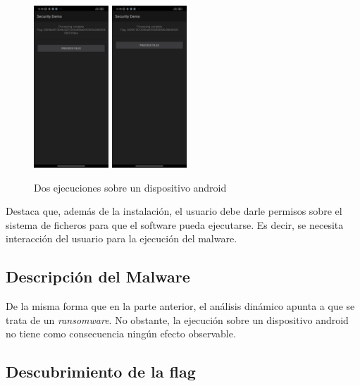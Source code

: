 \documentclass[]{article}
\begin{document}
\begin{figure}[H]
\centering
\includegraphics[width=0.25\textwidth]{screenshot1.jpg}
\includegraphics[width=0.25\textwidth]{screenshot2.jpg}
\caption{Dos ejecuciones sobre un dispositivo android}
\label{ejec}
\end{figure}

Destaca que, además de la instalación, el usuario debe darle permisos sobre el
sistema de ficheros para que el software pueda ejecutarse. Es decir, se
necesita interacción del usuario para la ejecución del malware.

\subsection{Descripción del Malware}
\label{malware1}

De la misma forma que en la parte anterior, el análisis dinámico apunta a que
se trata de un \textit{ransomware}. No obstante, la ejecución sobre un
dispositivo android no tiene como consecuencia ningún efecto observable.

\subsection{Descubrimiento de la flag}
\label{flag1}
\end{document}
